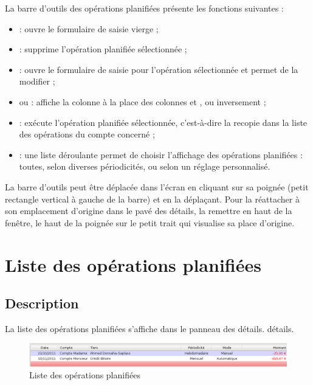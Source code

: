 La barre d'outils des opérations planifiées présente les fonctions suivantes : 

\begin{itemize}
	 \item {} : ouvre le formulaire de saisie vierge ;
	 \item {} : supprime l'opération planifiée sélectionnée ;
	 \item {} : ouvre le formulaire de saisie pour l'opération sélectionnée et permet de la modifier ;
	 \item {} ou  : affiche la colonne  à la place des colonnes  et , ou inversement ; 
	 \item {} : exécute l'opération planifiée sélectionnée, c'est-à-dire la recopie dans la liste des opérations du compte concerné ;
	 \item {} : une liste déroulante permet de choisir l'affichage des opérations planifiées : toutes, selon diverses périodicités, ou selon un réglage personnalisé.
\end{itemize}

La barre d'outils peut être déplacée dans l'écran en cliquant sur sa poignée (petit rectangle vertical à gauche de la barre) et en la déplaçant. Pour la réattacher à son emplacement d'origine dans le pavé des détails, la remettre en haut de la fenêtre, le haut de la poignée sur le petit trait qui visualise sa place d'origine.

\ifIllustration
\newpage
\fi


\section{Liste des opérations planifiées\label{plannedtransactions-list}}


\subsection{Description\label{plannedtransactions-list-description}}

La liste des opérations planifiées s'affiche dans le panneau des
\ifIllustration détails.
\else détails.
\fi

\ifIllustration
\begin{figure}[htbp]
\begin{center}
\includegraphics[scale=0.5]{image/screenshot/planned_transactions_list}
\end{center}
\caption{Liste des opérations planifiées}
\label{planned-transactions-list-img}
\end{figure}
\fi

